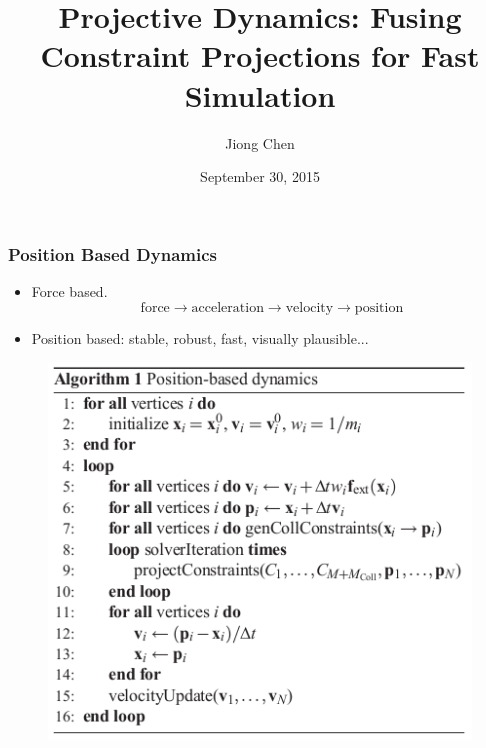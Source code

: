 \documentclass[serif,mathserif]{beamer}
\author[Jiong Chen]{Jiong Chen}
\title[\hspace{2em}\insertframenumber/\inserttotalframenumber]{Projective Dynamics: Fusing Constraint Projections for Fast Simulation}
\date{September 30, 2015} %
\begin{document}
\maketitle


\begin{frame}
  \frametitle{Position Based Dynamics}
  \begin{itemize}
    \item Force based.
      \begin{equation*}
	\text{force} \rightarrow \text{acceleration} \rightarrow \text{velocity} \rightarrow \text{position}
      \end{equation*}
    \item Position based: stable, robust, fast, visually plausible...
  \end{itemize}
  \begin{figure}[t]
      \centering
      \includegraphics[scale=0.4]{pic/pbd.png}
  \end{figure}
\end{frame}
\end{document}
